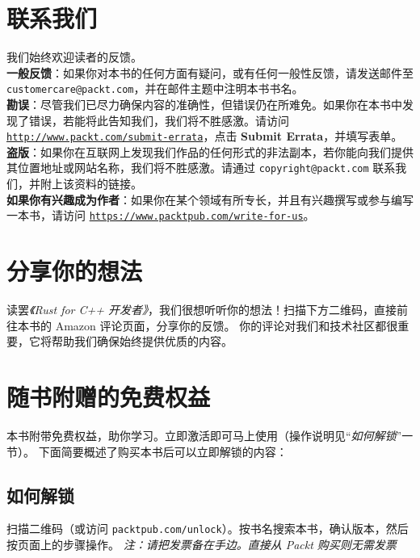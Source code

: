 \section{联系我们}
我们始终欢迎读者的反馈。
\\
\textbf{一般反馈}：如果你对本书的任何方面有疑问，或有任何一般性反馈，请发送邮件至 \texttt{customercare@packt.\allowbreak{}com}，并在邮件主题中注明本书书名。
\\
\textbf{勘误}：尽管我们已尽力确保内容的准确性，但错误仍在所难免。如果你在本书中发现了错误，若能将此告知我们，我们将不胜感激。请访问 \href{http://www.packt.com/submit-errata}{\texttt{http:/\allowbreak{}/\allowbreak{}www.\allowbreak{}packt.\allowbreak{}com/\allowbreak{}submit-\allowbreak{}errata}}，点击 \textbf{Submit Errata}，并填写表单。
\\
\textbf{盗版}：如果你在互联网上发现我们作品的任何形式的非法副本，若你能向我们提供其位置地址或网站名称，我们将不胜感激。请通过 \texttt{copyright@packt.\allowbreak{}com} 联系我们，并附上该资料的链接。
\\
\textbf{如果你有兴趣成为作者}：如果你在某个领域有所专长，并且有兴趣撰写或参与编写一本书，请访问 \href{https://www.packtpub.com/write-for-us}{\texttt{https:/\allowbreak{}/\allowbreak{}www.\allowbreak{}packtpub.\allowbreak{}com/\allowbreak{}write-\allowbreak{}for-\allowbreak{}us}}。

\section{分享你的想法}
读罢\emph{《Rust for C++ 开发者》}，我们很想听听你的想法！扫描下方二维码，直接前往本书的 Amazon 评论页面，分享你的反馈。
你的评论对我们和技术社区都很重要，它将帮助我们确保始终提供优质的内容。
\section{随书附赠的免费权益}
本书附带免费权益，助你学习。立即激活即可马上使用（操作说明见“\emph{如何解锁}”一节）。
下面简要概述了购买本书后可以立即解锁的内容：
\subsection{如何解锁}
扫描二维码（或访问 \texttt{packtpub.\allowbreak{}com/\allowbreak{}unlock}）。按书名搜索本书，确认版本，然后按页面上的步骤操作。
\emph{注：请把发票备在手边。直接从 Packt 购买则无需发票}
